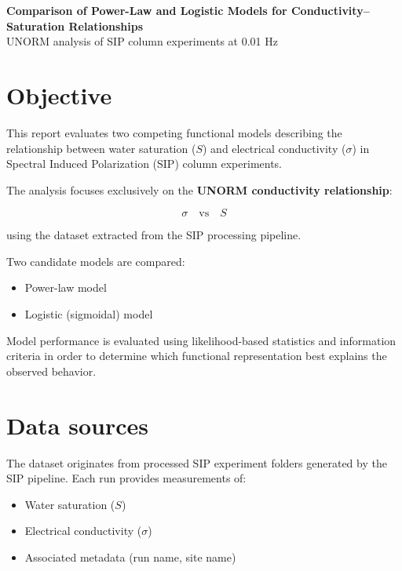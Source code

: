 \documentclass[11pt]{article}
\begin{document}
\begin{center}

{\LARGE\bfseries\color{accent}
Comparison of Power-Law and Logistic Models for Conductivity–Saturation Relationships}\\[0.4em]

{\large UNORM analysis of SIP column experiments at 0.01 Hz}

\end{center}

\section{Objective}

This report evaluates two competing functional models describing the relationship between water saturation ($S$) and electrical conductivity ($\sigma$) in Spectral Induced Polarization (SIP) column experiments.

The analysis focuses exclusively on the \textbf{UNORM conductivity relationship}:

\[
\sigma \quad \text{vs} \quad S
\]

using the dataset extracted from the SIP processing pipeline.

Two candidate models are compared:

\begin{itemize}

\item Power-law model
\item Logistic (sigmoidal) model

\end{itemize}

Model performance is evaluated using likelihood-based statistics and information criteria in order to determine which functional representation best explains the observed behavior.

\section{Data sources}

The dataset originates from processed SIP experiment folders generated by the SIP pipeline. Each run provides measurements of:

\begin{itemize}

\item Water saturation ($S$)
\item Electrical conductivity ($\sigma$)
\item Associated metadata (run name, site name)

\end{itemize}
\end{document}
